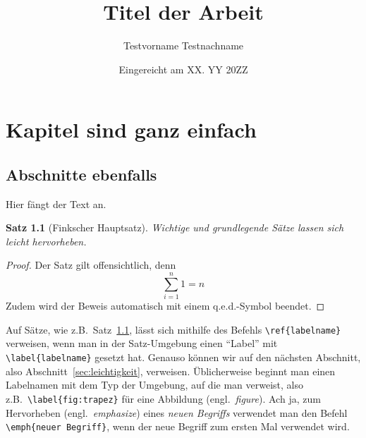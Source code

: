 \documentclass[a4paper]{scrreprt}
\newtheorem{satz}{Satz}[chapter]
\theoremstyle{definition}
\newenvironment{beweis}{\begin{proof}}{\end{proof}}
\begin{document}


\subject{Bachelorarbeit} %
\title{Titel der Arbeit} %
\author{Testvorname Testnachname} %
\date{Eingereicht am XX. YY 20ZZ} %
\titlehead{Julius-Maximilians-Universität Würzburg\\
Institut für Informatik\\
Lehrstuhl für Informatik I\\
Effiziente Algorithmen und wissensbasierte Systeme}
\publishers{Betreuer:\\
Prof.\ Dr.\ Alexander Wolff\\
Dipl.-Inf.\ Max Mustermann} %
\maketitle


\tableofcontents

\chapter{Kapitel sind ganz einfach}

\section{Abschnitte ebenfalls}

Hier fängt der Text an.

\begin{satz}[Finkscher Hauptsatz] \label{thm:fink}
  Wichtige und grundlegende Sätze lassen sich leicht hervorheben.
\end{satz}

\begin{beweis}
  Der Satz gilt offensichtlich, denn
  \begin{equation*}
    \sum_{i=1}^{n} 1 = n
  \end{equation*}
  Zudem wird der Beweis automatisch mit einem q.e.d.-Symbol beendet.
\end{beweis}

Auf Sätze, wie z.B.\ Satz~\ref{thm:fink}, lässt sich mithilfe des
Befehls \verb+\ref{labelname}+ verweisen, wenn man in der
Satz-Umgebung einen "`Label"' mit \verb+\label{labelname}+ gesetzt
hat.  Genauso können wir auf den nächsten Abschnitt, also
Abschnitt~\ref{sec:leichtigkeit}, verweisen.  Üblicherweise beginnt
man einen Labelnamen mit dem Typ der Umgebung, auf die man verweist,
also z.B.\ \verb+\label{fig:trapez}+ für eine Abbildung (engl.\
\emph{figure}).  Ach ja, zum Hervorheben (engl.\ \emph{emphasize})
eines \emph{neuen Begriffs} verwendet man den Befehl
\verb+\emph{neuer Begriff}+, wenn der neue Begriff zum ersten Mal
verwendet wird.
\end{document}
